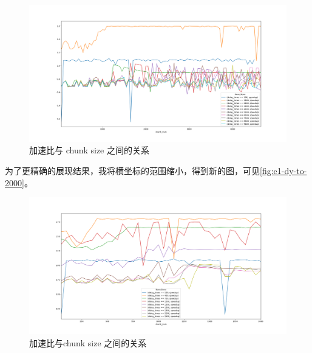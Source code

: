\documentclass[forprint]{myreport}
\begin{document}
\begin{figure}[htp]
    \centering
    \includegraphics[width=17cm]{"../HW3-1/figure/dynamic_chunk_num.png"}
    \caption{加速比与 chunk size 之间的关系}
    \label{fig:e1-dy-full}
\end{figure}

为了更精确的展现结果，我将横坐标的范围缩小，得到新的图，可见\autoref{fig:e1-dy-to-2000}。

\begin{figure}[htp]
    \centering
    \includegraphics[width=17cm]{"../HW3-1/figure/dynamic_chunk_num100-2000.png"}
    \caption{加速比与chunk size 之间的关系}
    \label{fig:e1-dy-to-2000}
\end{figure}
\end{document}
